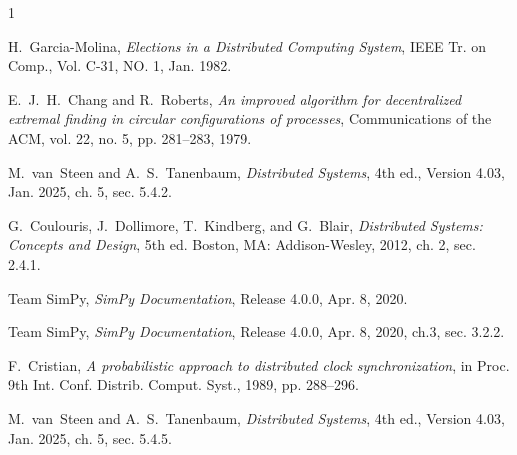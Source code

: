 \documentclass[10pt,journal,compsoc]{IEEEtran}
\begin{document}
\ifCLASSOPTIONcaptionsoff
  \newpage
\fi

\begin{thebibliography}{1}

H.~Garcia-Molina, \emph{Elections in a Distributed Computing System}, IEEE Tr.
on Comp., Vol. C-31, NO. 1, Jan. 1982.

E.~J.~H.~Chang and R.~Roberts, \emph{An improved algorithm for decentralized
extremal finding in circular configurations of processes}, Communications of the
ACM, vol. 22, no. 5, pp. 281–283, 1979.

M.~van~Steen and A.~S.~Tanenbaum, \emph{Distributed Systems}, 4th ed., Version
4.03, Jan. 2025, ch. 5, sec. 5.4.2.

G.~Coulouris, J.~Dollimore, T.~Kindberg, and G.~Blair, \emph{Distributed
Systems: Concepts and Design}, 5th ed. Boston, MA: Addison-Wesley, 2012, ch. 2,
sec. 2.4.1.

Team SimPy, \emph{SimPy Documentation}, Release 4.0.0, Apr. 8, 2020. 

Team SimPy, \emph{SimPy Documentation}, Release 4.0.0, Apr. 8, 2020, ch.3,
sec. 3.2.2. 

F.~Cristian, \emph{A probabilistic approach to distributed clock
synchronization}, in Proc. 9th Int. Conf. Distrib. Comput. Syst., 1989,
pp. 288–296.

M.~van~Steen and A.~S.~Tanenbaum, \emph{Distributed Systems}, 4th ed., Version
4.03, Jan. 2025, ch. 5, sec. 5.4.5.

\end{thebibliography}
\end{document}
